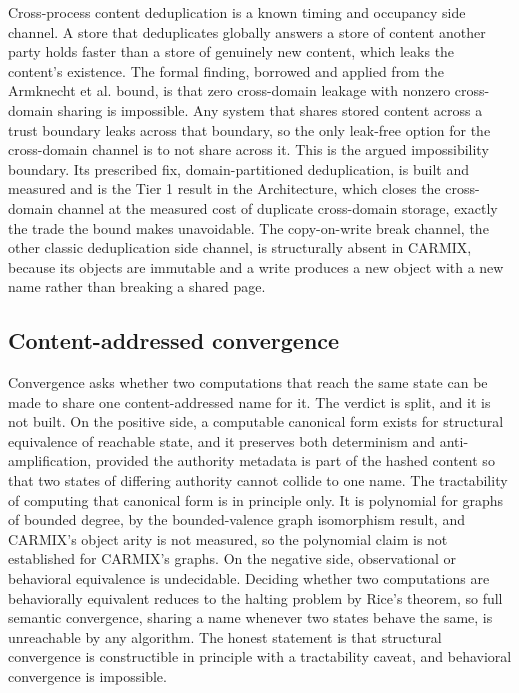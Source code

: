 \documentclass[10pt,twocolumn]{article}
\newcommand{\carmix}{CARMIX}
\begin{document}
Cross-process content deduplication is a known timing and occupancy side channel.
A store that deduplicates globally answers a store of content another party holds
faster than a store of genuinely new content, which leaks the content's existence.
The formal finding, borrowed and applied from the Armknecht et al. bound, is that
zero cross-domain leakage with nonzero cross-domain sharing is impossible. Any
system that shares stored content across a trust boundary leaks across that
boundary, so the only leak-free option for the cross-domain channel is to not
share across it. This is the argued impossibility boundary. Its prescribed fix,
domain-partitioned deduplication, is built and measured and is the Tier 1 result
in the Architecture, which closes the cross-domain channel at the measured cost of
duplicate cross-domain storage, exactly the trade the bound makes unavoidable. The
copy-on-write break channel, the other classic deduplication side channel, is
structurally absent in \carmix{}, because its objects are immutable and a write
produces a new object with a new name rather than breaking a shared page.

\subsection{Content-addressed convergence}

Convergence asks whether two computations that reach the same state can be made to
share one content-addressed name for it. The verdict is split, and it is not
built. On the positive side, a computable canonical form exists for structural
equivalence of reachable state, and it preserves both determinism and
anti-amplification, provided the authority metadata is part of the hashed content
so that two states of differing authority cannot collide to one name. The
tractability of computing that canonical form is in principle only. It is
polynomial for graphs of bounded degree, by the bounded-valence graph isomorphism
result, and \carmix{}'s object arity is not measured, so the polynomial claim is
not established for \carmix{}'s graphs. On the negative side, observational or
behavioral equivalence is undecidable. Deciding whether two computations are
behaviorally equivalent reduces to the halting problem by Rice's theorem, so full
semantic convergence, sharing a name whenever two states behave the same, is
unreachable by any algorithm. The honest statement is that structural convergence
is constructible in principle with a tractability caveat, and behavioral
convergence is impossible.
\end{document}
